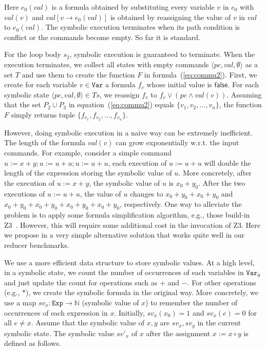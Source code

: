\documentclass{llncs}
\newcommand{\Var}{\mathtt{Var}}
\newcommand{\Exp}{\mathtt{Exp}}
\newcommand{\false}{\mathsf{false}}
\begin{document}
Here $e_0(val)$ is a formula obtained by substituting every variable $v$ in $e_0$ with $val(v)$ and $val[v \rightarrow e_0(val) ]$ is obtained by reassigning the value of $v$ in $val$ to $e_0(val)$. The symbolic execution terminates when its path condition is conflict or the commands become empty. So far it is standard.

For the loop body $s_2$, symbolic execution is guaranteed to terminate.
When the execution terminates, we collect all states with empty commands $\langle pc, val, \emptyset \rangle$ as a set $T$ and use them to create the function $F$ in formula~(\ref{eq:commu2}).
First, we create for each variable $v\in\Var$ a formula $f_v$ whose initial value is $\false$. For each symbolic state $\langle pc, val, \emptyset \rangle \in Ts$, we reassign $f_v$ to $f_v \vee (pc \wedge val(v))$.
Assuming that the set $P_2\cup P_3$ in equation~(\ref{eq:commu2}) equals $\{v_1,v_2,\ldots,v_n\}$, the function $F$ simply returns tuple $\{f_{v_1},f_{v_2},\ldots, f_{v_n}\}$.

However, doing symbolic execution in a naive way can be extremely inefficient.
The length of the formula $val(v)$ can grow exponentially w.r.t. the input commands. For example, consider a simple command $u:=x+y;u:=u+u;u:=u+u$, each execution of $u:= u+ u$ will double the length of the expression storing the symbolic value of $u$. More concretely, after the execution of $u:=x+y$, the symbolic value of $u$ is $x_0+y_0$. After the two executions of $u:=u+u$, the value of $u$ changes to $x_0+y_0+x_0+y_0$ and $x_0+y_0+x_0+y_0+x_0+y_0+x_0+y_0$, respectively. One way to alleviate the problem is to apply some formula simplification algorithm, e.g., those build-in Z3~\cite{z3}.
However, this will require some additional cost in the invocation of Z3. Here we propose in a very simple alternative solution that works quite well in our reducer benchmarks.

We use a more efficient data structure to store symbolic values. At a high level, in a symbolic state, we count the number of occurrences of each variables in $\Var_0$ and just update the count for operations such as $+$ and $-$. For other operations (e.g., $*$), we create the symbolic formula in the original way.
More concretely, we use a map $sv_x:\Exp\rightarrow \mathbb{N}$ (symbolic value of $x$) to remember the number of occurrences of each expression in $x$. Initially, $sv_x(x_0) = 1$ and $sv_x (e) =0$ for all $e\neq x$. Assume that the symbolic value of $x,y$ are $sv_x,sv_y$ in the current symbolic state. The symbolic value $sv'_x$ of $x$ after the assignment $x:=x\circ y$ is defined as follows.
\end{document}
